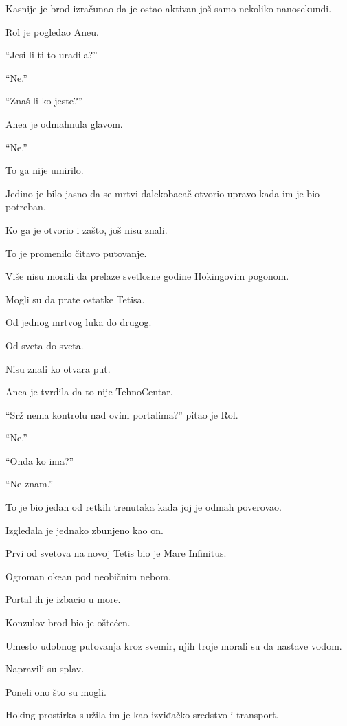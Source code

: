 Kasnije je brod izračunao da je ostao aktivan još samo nekoliko nanosekundi.

Rol je pogledao Aneu.

``Jesi li ti to uradila?''

``Ne.''

``Znaš li ko jeste?''

Anea je odmahnula glavom.

``Ne.''

\bigskip

To ga nije umirilo.

Jedino je bilo jasno da se mrtvi dalekobacač otvorio upravo kada im je bio potreban.

Ko ga je otvorio i zašto, još nisu znali.

\bigskip

To je promenilo čitavo putovanje.

Više nisu morali da prelaze svetlosne godine Hokingovim pogonom.

Mogli su da prate ostatke Tetisa.

Od jednog mrtvog luka do drugog.

Od sveta do sveta.

\bigskip

Nisu znali ko otvara put.

Anea je tvrdila da to nije TehnoCentar.

``Srž nema kontrolu nad ovim portalima?'' pitao je Rol.

``Ne.''

``Onda ko ima?''

``Ne znam.''

To je bio jedan od retkih trenutaka kada joj je odmah poverovao.

Izgledala je jednako zbunjeno kao on.

\bigskip

Prvi od svetova na novoj Tetis bio je Mare Infinitus.

Ogroman okean pod neobičnim nebom.

Portal ih je izbacio u more.

Konzulov brod bio je oštećen.

Umesto udobnog putovanja kroz svemir, njih troje morali su da nastave vodom.

Napravili su splav.

Poneli ono što su mogli.

Hoking-prostirka služila im je kao izviđačko sredstvo i transport.

\bigskip

